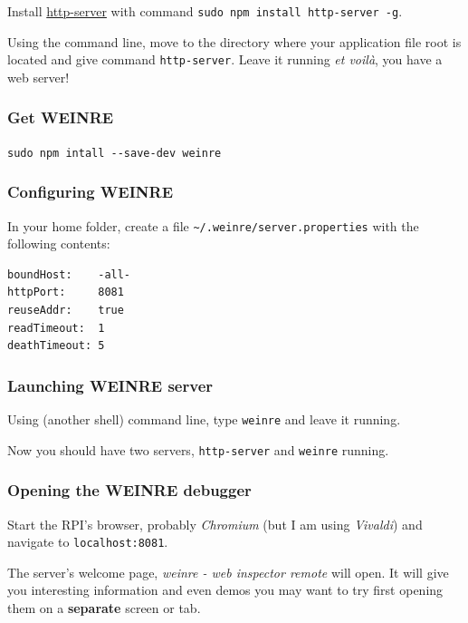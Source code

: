 \documentclass[11pt]{article}
\begin{document}
    Install \href{https://www.npmjs.com/package/http-server}{http-server}
with command \texttt{sudo\ npm\ install\ http-server\ -g}.

    Using the command line, move to the directory where your application
file root is located and give command \texttt{http-server}. Leave it
running \emph{et voilà}, you have a web server!

    \hypertarget{get-weinre}{%
\subsubsection{Get WEINRE}\label{get-weinre}}

    \texttt{sudo\ npm\ intall\ -\/-save-dev\ weinre}

    \hypertarget{configuring-weinre}{%
\subsubsection{Configuring WEINRE}\label{configuring-weinre}}

    In your home folder, create a file
\texttt{\textasciitilde{}/.weinre/server.properties} with the following
contents:

    \begin{verbatim}
boundHost:    -all-
httpPort:     8081
reuseAddr:    true
readTimeout:  1
deathTimeout: 5
\end{verbatim}

    \hypertarget{launching-weinre-server}{%
\subsubsection{Launching WEINRE server}\label{launching-weinre-server}}

    Using (another shell) command line, type \texttt{weinre} and leave it
running.

    Now you should have two servers, \texttt{http-server} and
\texttt{weinre} running.

    \hypertarget{opening-the-weinre-debugger}{%
\subsubsection{Opening the WEINRE
debugger}\label{opening-the-weinre-debugger}}

    Start the RPI's browser, probably \emph{Chromium} (but I am using
\emph{Vivaldi}) and navigate to \texttt{localhost:8081}.

    The server's welcome page, \emph{weinre - web inspector remote} will
open. It will give you interesting information and even demos you may
want to try first opening them on a \textbf{separate} screen or tab.
\end{document}
